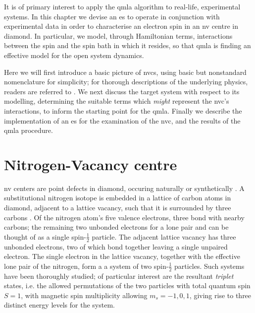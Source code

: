 It is of primary interest to apply the \gls{qmla} algorithm to real-life, experimental systems. 
In this chapter we devise an \gls{es} to operate in conjunction with experimental data 
    in order to characterise an electron spin in an \gls{nv} centre in diamond.
In particular, we model, through Hamiltonian terms, interactions between the spin and 
    the spin bath in which it resides,
    so that \gls{qmla} is finding an effective model for the open system dynamics.
\par

Here we will first introduce a basic picture of \glspl{nvc}, 
    using basic but nonstandard nomenclature for simplicity;
    for thorough descriptions of the underlying physics, readers are referred to \cite{doherty2013nitrogen}.
We next discuss the target system with respect to its modelling, 
    determining the suitable terms which \emph{might} represent the \gls{nvc}'s interactions, 
    to inform the starting point for the \gls{qmla}.
Finally we describe the implementation of an \gls{es} for the examination of the \gls{nvc},
    and the results of the \gls{qmla} procedure. 

\section{Nitrogen-Vacancy centre}
\label{sec:nv_centres}

\gls{nv} centers are point defects in diamond, 
    occuring naturally \cite{davies1976optical} or synthetically \cite{meijer2005generation, edmonds2012production}.
A substitutional \gls{nitrogen} isotope is embedded in a lattice of carbon atoms in diamond, 
    adjacent to a lattice vacancy, 
    such that it is surrounded by three \glspl{carbon} \cite{lenef1996electronic}. 
Of the \gls{nitrogen} atom's five valence electrons, three bond with nearby \glspl{carbon};
    the remaining two unbonded electrons for a lone pair and can be thought of as a single spin-$\frac{1}{2}$ particle. 
The adjacent lattice vacancy has three unbonded electrons, 
    two of which bond together leaving a single unpaired electron.
The single electron in the lattice vacancy, together with the effective lone pair of the \gls{nitrogen}, 
    form a a system of two spin-$\frac{1}{2}$ particles.
Such systems have been thoroughly studied; 
    of particular interest are the resultant \emph{triplet} states, 
    i.e. the allowed permutations of the two particles with total quantum spin $S=1$, 
    with magnetic spin multiplicity allowing $m_s = {-1, 0, 1}$, 
    giving rise to three distinct energy levels for the system. 
\par 


